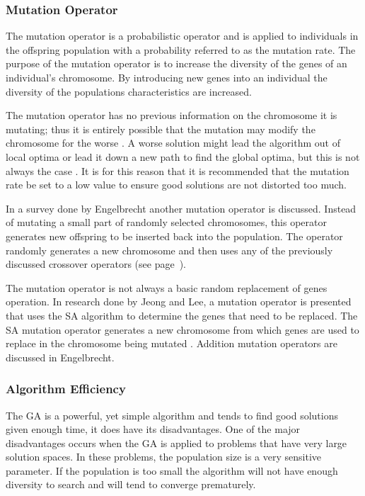 \subsubsection{Mutation Operator}
\label{sec:mutation}
The mutation operator is a probabilistic operator and is applied to individuals in the offspring population with a probability referred to as the mutation rate\cite{CompuIntelligenceIntro}. The purpose of the mutation operator is to increase the diversity of the genes of an individual's chromosome\cite{CompuIntelligenceIntro}. By introducing new genes into an individual the diversity of the populations characteristics are increased\cite{CoactiveFuzzyGA,AcceleratingGA,ConstrainedGA}.

The mutation operator has no previous information on the chromosome it is mutating; thus it is entirely possible that the mutation may modify the chromosome for the worse \cite{AcceleratingGA}. A worse solution might lead the algorithm out of local optima or lead it down a new path to find the global optima, but this is not always the case \cite{AdaptiveSAGA,FamilyGA,ConstrainedGA}. It is for this reason that it is recommended that the mutation rate be set to a low value to ensure good solutions are not distorted too much\cite{CompuIntelligenceIntro}.

In a survey done by Engelbrecht\cite{CompuIntelligenceIntro} another mutation operator is discussed. Instead of mutating a small part of randomly selected chromosomes, this operator generates new offspring to be inserted back into the population. The operator randomly generates a new chromosome and then uses any of the previously discussed crossover operators (see page~\pageref{sec:crossover}).

The mutation operator is not always a basic random replacement of genes operation. In research done by Jeong and Lee\cite{AdaptiveSAGA}, a mutation operator is presented that uses the \gls{SA} algorithm to determine the genes that need to be replaced. The \gls{SA} mutation operator generates a new chromosome from which genes are used to replace in the chromosome being mutated \cite{AdaptiveSAGA}. Addition mutation operators are discussed in Engelbrecht\cite{CompuIntelligenceIntro}.
\subsubsection{Algorithm Efficiency}
The \gls{GA} is a powerful, yet simple algorithm and tends to find good solutions given enough time, it does have its disadvantages. One of the major disadvantages occurs when the \gls{GA} is applied to problems that have very large solution spaces. In these problems, the population size is a very sensitive parameter\cite{AdaptiveSAGA,HetergeneousGA,SelfAdaptiveDataMiningGA,PatternDetectionGA}. If the population is too small the algorithm will not have enough diversity to search and will tend to converge prematurely. 

